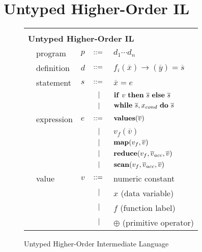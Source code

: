 \documentclass[preprint]{sigplanconf}
\begin{document}
\maketitle
\section{Untyped Higher-Order IL}
\begin{figure}[h!]
  \begin{tabular}{| m{0.01cm}m{1.5cm}m{0.1cm}m{0.2cm}p{4.5cm} |}
  \hline
  & & & &\\ 
   \multicolumn{5}{|l|}{\textbf{Untyped Higher-Order IL}}  \\[4pt]
  & program & $p$ &  $::=$   &  $d_1 \cdots d_n $ \\[4pt]
  & definition & $d$ & $::=$ & $f_i(\overline{x}) \rightarrow (\overline{y}) = \overline{s}$ \\[4pt]
  & statement  & $s$ & $::=$ & $\overline{x} = e $\\[2pt]
  &            &     & $\ \ | \ \ $    & $\mbox{\textbf{if}} ~v~ \mbox{\textbf{then}} ~ \overline{s} ~ \mbox{\textbf{else}} ~ \overline{s} $ \\[2pt]
  &            &     & $\ \ | \ \ $    & $\mbox{\textbf{while}} ~\overline{s}, x_{cond} ~ \mbox{\textbf{do}} ~\overline{s}~ $  \\[5pt]
  & expression & $e$ & $::=$ & $\mbox{\textbf{values}} (\overline{v})$ \\[2pt]
  &            &     & $\ \ | \ \ $    & $ v_f (\overline{v}) $ \\[5pt]
  &            &     & $\ \ | \ \ $    & $\mbox{\textbf{map}}(v_f, \overline{v})$ \\[2pt]
  &            &     & $\ \ | \ \ $    & $\mbox{\textbf{reduce}}(v_f, \overline{v}_{acc}, \overline{v})$ \\[2pt]
  &            &     & $\ \ | \ \ $    & $\mbox{\textbf{scan}}(v_f, \overline{v}_{acc}, \overline{v})$ \\[9pt]

  & value      & $v$ & $::=$ & numeric constant\\[2pt]
  &            &     & $\ \ | \ \ $    &  $x$  \quad \small{(data variable)} \\[2pt]
  &            &     & $\ \ | \ \ $    &  $f$  \quad \small{(function label)} \\[2pt]
  &            &     & $\ \ | \ \ $    &  $\oplus$ \quad \small{(primitive operator)} \\[5pt]
  \hline
  \end{tabular}
\caption{Untyped Higher-Order Intermediate Language}
\end{figure}
\end{document}
